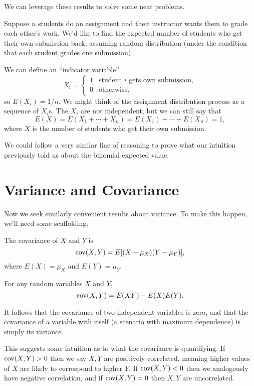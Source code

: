 \documentclass[../m157main.tex]{subfiles}
\begin{document}
We can leverage these results to solve some neat problems.

\begin{example}
    Suppose $n$ students do an assignment and their instructor wants them to grade each other's work.
    We'd like to find the expected number of students who get their own submission back, assuming random distribution (under the condition that each student grades one submission).

    We can define an ``indicator variable''
    \[ X_i = \begin{cases} 1 & \textrm{student $i$ gets own submission}, \\ 0 & \textrm{otherwise}, \end{cases} \]
    so $E(X_i) = 1 / n$.
    We might think of the assignment distribution process as a sequence of $X_i$s.
    The $X_i$ are not independent, but we can still say that
    \[ E(X) = E(X_1 + \cdots + X_n) = E(X_1) + \cdots + E(X_n) = 1, \]
    where $X$ is the number of students who get their own submission.
\end{example}

We could follow a very similar line of reasoning to prove what our intuition previously told us about the binomial expected value.

\section{Variance and Covariance}
Now we seek similarly convenient results about variance.
To make this happen, we'll need some scaffolding.

\begin{definition}[Covariance]
    The covariance of $X$ and $Y$ is
    \[ \textrm{cov}(X,Y) = E[(X - \mu_X)(Y - \mu_Y)], \]
    where $E(X) = \mu_X$ and $E(Y) = \mu_Y$.
\end{definition}

\begin{theorem}
    For any random variables $X$ and $Y$,
    \[ \textrm{cov}(X,Y) = E(XY) - E(X) E(Y). \]
\end{theorem}

It follows that the covariance of two independent variables is zero, and that the covariance of a variable with itself (a scenario with maximum dependence) is simply its variance.

This suggests some intuition as to what the covariance is quantifying.
If $\textrm{cov} (X,Y) > 0$ then we say $X,Y$ are positively correlated, meaning higher values of $X$ are likely to correspond to higher $Y$.
If $\textrm{cov}(X,Y) < 0$ then we analogously have negative correlation, and if $\textrm{cov}(X,Y) = 0$ then $X,Y$ are uncorrelated.
\end{document}
